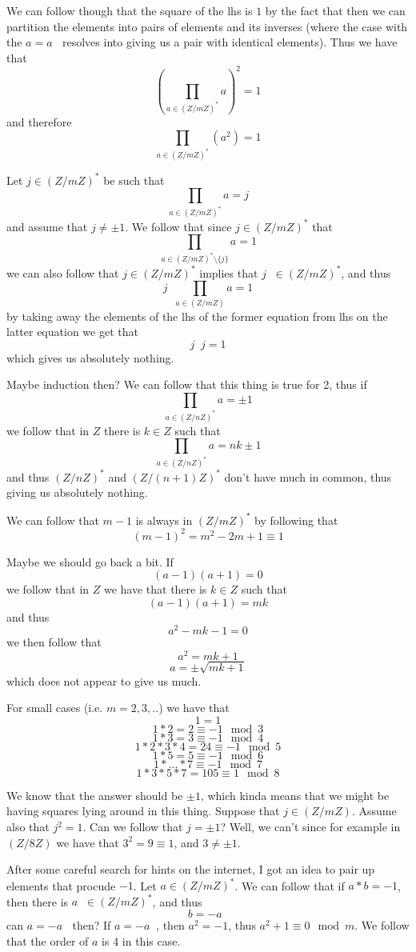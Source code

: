 \documentclass[11pt,oneside,titlepage]{book}
\DeclareMathOperator \inv {^{-1}}
\newcommand{\set}[1]{\{ #1 \}}
\begin{document}
We can follow though that the square of the lhs is $1$ by the
fact that then we can partition the elements into pairs
of elements and its inverses (where the case with the $a = a\inv$
resolves into giving us a pair with identical elements). Thus we have that
$$(\prod_{a \in (Z/mZ)^*}a)^2 = 1$$
and therefore
$$\prod_{a \in (Z/mZ)^*}(a^2) = 1$$

Let $j \in (Z/mZ)^*$ be such that
$$\prod_{a \in (Z/mZ)^*}a = j$$
and assume that $j \neq \pm 1$. We follow that since $j \in (Z/mZ)^*$
that
$$\prod_{a \in (Z/mZ)^* \setminus \set{j}}a = 1$$
we can also follow that $j \in (Z/mZ)^*$ implies that $j\inv \in
(Z/mZ)^*$, and thus
$$j\inv \prod_{a \in (Z/mZ)}a = 1$$
by taking away the elements of the lhs of the former equation from lhs
on the latter equation we get that
$$j\inv j = 1$$
which gives us absolutely nothing.

Maybe induction then? We can follow that this thing is true for 2,
thus if
$$\prod_{a \in (Z/nZ)^*}a = \pm 1$$
we follow that in $Z$ there is $k \in Z$ such that
$$\prod_{a \in (Z/nZ)^*}a = nk \pm 1$$
and thus $(Z/nZ)^*$ and $(Z/(n + 1)Z)^*$ don't have much in common,
thus giving us absolutely nothing.

We can follow that $m - 1$ is always in $(Z/mZ)^*$ by following that
$$(m - 1)^2 = m^2 - 2m + 1 \equiv 1$$

Maybe we should go back a bit. If
$$(a - 1) (a + 1) = 0$$
we follow that in $Z$ we have that there is $k \in Z$ such that
$$(a - 1) (a + 1) = mk$$
and thus
$$a^2 - mk - 1 = 0$$
we then follow that
$$a^2 = mk + 1$$
$$a = \pm \sqrt{mk + 1}$$
which does not appear to give us much.

For small cases (i.e. $m = 2, 3, ..$) we have that
$$1 = 1$$
$$1 * 2 = 2 \equiv -1 \mod 3$$
$$1 * 3 = 3 \equiv -1 \mod 4$$
$$1 * 2 * 3 * 4 = 24 \equiv -1 \mod 5$$
$$1 * 5 = 5 \equiv -1 \mod 6$$
$$1 * ... *  7  \equiv -1 \mod 7$$
$$1 * 3 * 5 * 7 = 105  \equiv 1 \mod 8$$

We know that the answer should be $\pm 1$, which kinda means that
we might be having squares lying around in this thing. 
Suppose that $j \in (Z/mZ)$. Assume also that $j^2 = 1$. Can we follow that
$j = \pm 1$? Well, we can't since for example in $(Z/8Z)$ we have that
$3^2 = 9 \equiv 1$, and $3 \neq \pm 1$.

After some careful search for hints on the internet, I got an idea to
pair up elements that procude $-1$. Let $a \in (Z/mZ)^*$. We can
follow that if $a * b = -1$, then there is $a\inv \in (Z/mZ)^*$, and
thus
$$b = -a\inv$$
can $a = -a\inv$ then? If $a = -a\inv$, then $a^2 = -1$, thus $a^2 + 1
\equiv 0 \mod m$. We follow that the order of $a$ is 4 in this case.
\end{document}
